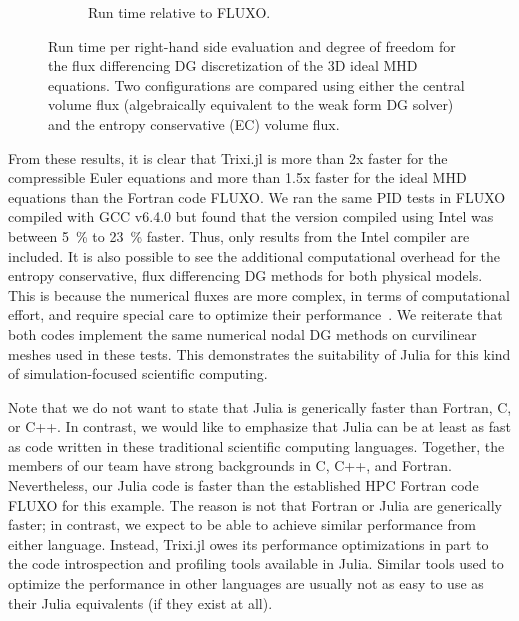 \documentclass[hidelinks]{juliacon} %
\newcommand{\trixi}{Trixi.jl\xspace}
\begin{document}
\begin{figure}[!ht]
\begin{subfigure}{\linewidth}
    \caption{Run time relative to FLUXO.}
  \end{subfigure}%
  \caption{Run time per right-hand side evaluation and degree of freedom for
           the flux differencing DG discretization of the 3D ideal MHD equations.
           Two configurations are compared using either the central volume flux
           (algebraically equivalent to the weak form DG solver) and the entropy
           conservative (EC) volume flux.}
  \label{fig:PID-MHD}
\end{figure}

From these results, it is clear that \trixi is more than 2x faster for the compressible Euler equations
and more than 1.5x faster for the ideal MHD equations than the Fortran code FLUXO.
We ran the same PID tests in FLUXO compiled with GCC v6.4.0 but found that
the version compiled using Intel was between \SI{5}{\percent} to \SI{23}{\percent} faster.
Thus, only results from the Intel compiler are included.
It is also possible to see the additional computational overhead for the entropy conservative, flux
differencing DG methods for both physical models. This is because the numerical fluxes are more complex, in
terms of computational effort, and require special care to optimize their performance~\cite{hendrik_blog}.
We reiterate that both codes implement the same numerical nodal DG methods on curvilinear meshes used in these tests.
This demonstrates the suitability of Julia for this kind of simulation-focused scientific computing.

Note that we do not want to state that Julia is generically faster than Fortran,
C, or C++. In contrast, we would like to emphasize that Julia can be at least
as fast as code written in these traditional scientific computing languages.
Together, the members of our team have strong backgrounds in C, C++, and
Fortran. Nevertheless, our Julia code is faster than the established HPC Fortran
code FLUXO for this example. The reason is not that Fortran or Julia are generically
faster; in contrast, we expect to be able to achieve similar performance from either
language. Instead, \trixi owes its performance optimizations in part to the code
introspection and profiling tools available in Julia. Similar tools used to optimize the
performance in other languages are usually not as easy to use as their Julia
equivalents (if they exist at all).
\end{document}
